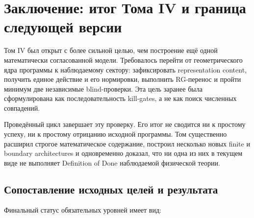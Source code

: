 \chapter{Заключение: итог Тома IV и граница следующей версии}

Том IV был открыт с более сильной целью, чем построение ещё одной
математически согласованной модели. Требовалось перейти от геометрического
ядра программы к наблюдаемому сектору: зафиксировать representation content,
получить единое действие и его нормировки, выполнить RG-перенос и пройти
минимум две независимые blind-проверки. Эта цель заранее была сформулирована
как последовательность kill-gates, а не как поиск численных совпадений.

Проведённый цикл завершает эту проверку. Его итог не сводится ни к простому
успеху, ни к простому отрицанию исходной программы. Том существенно расширил
строгое математическое содержание, построил несколько новых finite и
boundary architectures и одновременно доказал, что ни одна из них в
текущем виде не выполняет Definition of Done наблюдаемой физической теории.

\section{Сопоставление исходных целей и результата}

Финальный статус обязательных уровней имеет вид:


